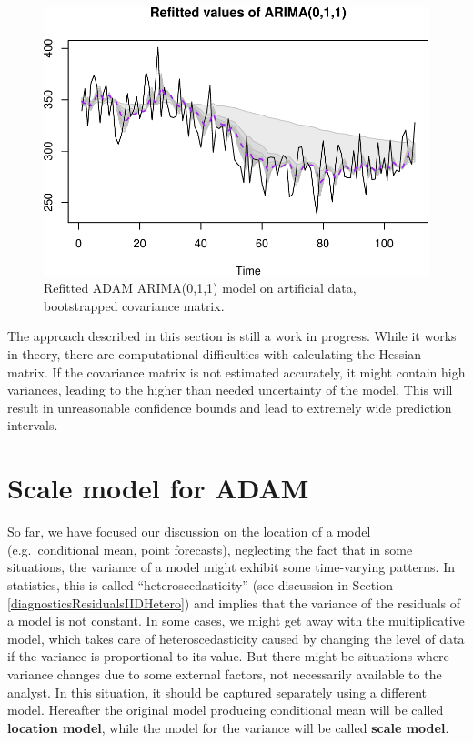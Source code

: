 \documentclass[
]{book}
\theoremstyle{definition}
\theoremstyle{definition}
\theoremstyle{definition}
\theoremstyle{definition}
\theoremstyle{remark}
\begin{document}
\begin{figure}
\centering
\includegraphics{Svetunkov--2022----ADAM_files/figure-latex/adamARIMARefitted200-1.pdf}
\caption{\label{fig:adamARIMARefitted200}Refitted ADAM ARIMA(0,1,1) model on artificial data, bootstrapped covariance matrix.}
\end{figure}

The approach described in this section is still a work in progress. While it works in theory, there are computational difficulties with calculating the Hessian matrix. If the covariance matrix is not estimated accurately, it might contain high variances, leading to the higher than needed uncertainty of the model. This will result in unreasonable confidence bounds and lead to extremely wide prediction intervals.

\hypertarget{ADAMscaleModel}{%
\chapter{Scale model for ADAM}\label{ADAMscaleModel}}

So far, we have focused our discussion on the location of a model (e.g.~conditional mean, point forecasts), neglecting the fact that in some situations, the variance of a model might exhibit some time-varying patterns. In statistics, this is called ``heteroscedasticity'' (see discussion in Section \ref{diagnosticsResidualsIIDHetero}) and implies that the variance of the residuals of a model is not constant. In some cases, we might get away with the multiplicative model, which takes care of heteroscedasticity caused by changing the level of data if the variance is proportional to its value. But there might be situations where variance changes due to some external factors, not necessarily available to the analyst. In this situation, it should be captured separately using a different model. Hereafter the original model producing conditional mean will be called \textbf{location model}, while the model for the variance will be called \textbf{scale model}.
\end{document}
